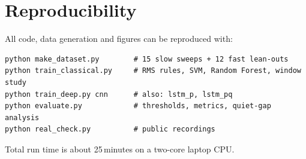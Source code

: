 \documentclass[11pt,a4paper]{article}
\begin{document}
\section{Reproducibility}
All code, data generation and figures can be reproduced with:
\begin{lstlisting}
python make_dataset.py        # 15 slow sweeps + 12 fast lean-outs
python train_classical.py     # RMS rules, SVM, Random Forest, window study
python train_deep.py cnn      # also: lstm_p, lstm_pq
python evaluate.py            # thresholds, metrics, quiet-gap analysis
python real_check.py          # public recordings
\end{lstlisting}
Total run time is about 25\,minutes on a two-core laptop CPU.
\end{document}
